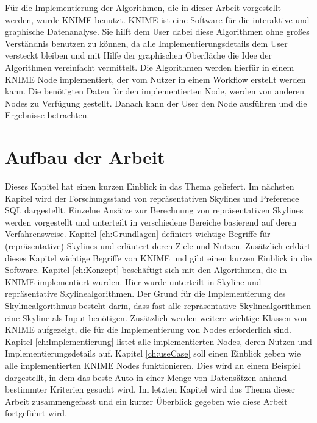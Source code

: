 Für die Implementierung der Algorithmen, die in dieser Arbeit vorgestellt werden, wurde KNIME benutzt. KNIME ist eine Software für die interaktive und graphische Datenanalyse. Sie hilft dem User dabei diese Algorithmen ohne großes Verständnis benutzen zu können, da alle Implementierungsdetails dem User versteckt bleiben und mit Hilfe der graphischen Oberfläche die Idee der Algorithmen vereinfacht vermittelt. Die Algorithmen werden hierfür in einem KNIME Node implementiert, der vom Nutzer in einem Workflow erstellt werden kann. Die benötigten Daten für den implementierten Node, werden von anderen Nodes zu Verfügung gestellt. Danach kann der User den Node ausführen und die Ergebnisse betrachten. 
\section{Aufbau der Arbeit}
\label{ch:Einleitung:sec:Gliederung}
Dieses Kapitel hat einen kurzen Einblick in das Thema geliefert. Im nächsten Kapitel wird der Forschungsstand von repräsentativen Skylines und Preference SQL dargestellt. Einzelne Ansätze zur Berechnung von repräsentativen Skylines werden vorgestellt und unterteilt in verschiedene Bereiche basierend auf deren Verfahrensweise. 
Kapitel \ref{ch:Grundlagen} definiert wichtige Begriffe für (repräsentative) Skylines und erläutert deren Ziele und Nutzen. Zusätzlich erklärt dieses Kapitel wichtige Begriffe von KNIME und gibt einen kurzen Einblick in die Software.
Kapitel \ref{ch:Konzept} beschäftigt sich mit den Algorithmen, die in KNIME implementiert wurden. Hier wurde unterteilt in Skyline und repräsentative Skylinealgorithmen. Der Grund für die Implementierung des Skylinealgorithmus besteht darin, dass fast alle repräsentative Skylinealgorithmen eine Skyline als Input benötigen. Zusätzlich werden weitere wichtige Klassen von KNIME aufgezeigt, die für die Implementierung von Nodes erforderlich sind. Kapitel \ref{ch:Implementierung} listet alle implementierten Nodes, deren Nutzen und Implementierungsdetails auf.
Kapitel \ref{ch:useCase} soll einen Einblick geben wie alle implementierten KNIME Nodes funktionieren. Dies wird an einem Beispiel dargestellt, in dem das beste Auto in einer Menge von Datensätzen anhand bestimmter Kriterien gesucht wird. Im letzten Kapitel wird das Thema dieser Arbeit zusammengefasst und ein kurzer Überblick gegeben wie diese Arbeit fortgeführt wird.
